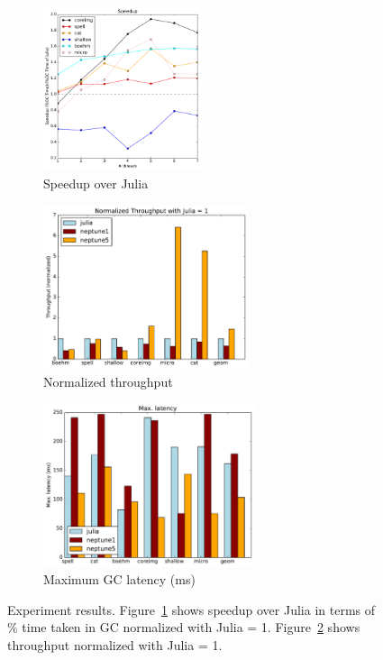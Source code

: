 \begin{figure}[h]
  \centering
    \begin{subfigure}{0.32\textwidth}
      \centering
      \includegraphics[height=4.8cm]{figures/speedup-julia.pdf}
      \caption{Speedup over Julia}
      \label{fig:speedup}
    \end{subfigure}
    \begin{subfigure}{0.32\textwidth}
      \centering
      \includegraphics[height=4.8cm]{figures/throughput-normalized-julia.pdf}
      
      \caption{Normalized throughput}
      \label{fig:throughput}
    \end{subfigure}
    \begin{subfigure}{0.32\textwidth}
      \centering
      \includegraphics[height=4.8cm]{figures/max-latency.pdf}
      \caption{Maximum GC latency (ms)\\}
      \label{fig:latency}
    \end{subfigure}
    \vspace{-0.5em}
    \caption{Experiment results. Figure~\ref{fig:speedup} shows speedup over Julia in terms of \% time taken in GC normalized with Julia = 1. Figure~\ref{fig:throughput} shows throughput normalized with Julia = 1.}
  \label{fig:results}
\end{figure}

